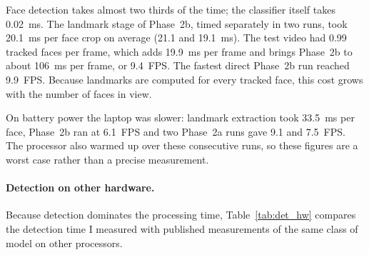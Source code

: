 Face detection takes almost two thirds of the time; the classifier itself takes 0.02~ms.
The landmark stage of Phase~2b, timed separately in two runs, took 20.1~ms per face crop
on average (21.1 and 19.1~ms). The test video had 0.99 tracked faces per frame, which adds
19.9~ms per frame and brings Phase~2b to about 106~ms per frame, or 9.4~FPS. The fastest
direct Phase~2b run reached 9.9~FPS. Because landmarks are computed for every tracked
face, this cost grows with the number of faces in view.

On battery power the laptop was slower: landmark extraction took 33.5~ms per face, Phase~2b
ran at 6.1~FPS and two Phase~2a runs gave 9.1 and 7.5~FPS. The processor also warmed up
over these consecutive runs, so these figures are a worst case rather than a precise
measurement.


\paragraph{Detection on other hardware.}
Because detection dominates the processing time, Table~\ref{tab:det_hw} compares the
detection time I measured with published measurements of the same class of model on other
processors.

